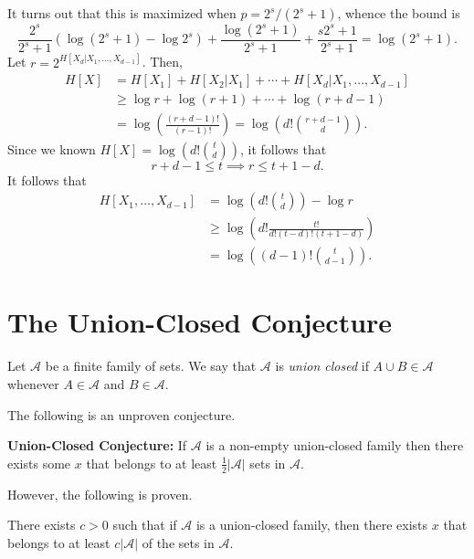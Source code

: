 \documentclass[12pt]{article}
\begin{document}
\begin{proofbox}
	It turns out that this is maximized when $p = 2^{s}/(2^{s}+1)$, whence the bound is
	\[
	\frac{2^{s}}{2^{s} + 1} (\log(2^{s} + 1) - \log 2^{s}) + \frac{\log(2^{s}+1)}{2^{s}+1} + \frac{s 2^{s} + 1}{2^{s} + 1} = \log(2^{s} + 1).
	\]
	Let $r = 2^{H[X_d|X_1,\ldots, X_{d-1}]}$. Then,
	\begin{align*}
		H[X] &= H[X_1] + H[X_2|X_1] + \cdots + H[X_d|X_1,\ldots,X_{d-1}] \\
		     &\geq \log r + \log(r + 1) + \cdots + \log(r + d - 1) \\
		     &= \log \left( \frac{(r + d - 1)!}{(r - 1)!} \right) = \log \left( d! \binom{r+d-1}d\right).
	\end{align*}
	Since we known $H[X] = \log( d! \binom t d)$, it follows that
	\[
	r + d - 1 \leq t \implies r \leq t + 1 - d.
	\]
	It follows that
	\begin{align*}
		H[X_1, \ldots, X_{d-1}] &= \log \left( d! \binom t d \right) - \log r \\
					&\geq \log \left( d! \frac{t!}{d! (t - d)! (t + 1 - d)} \right) \\
					&= \log \left((d-1)! \binom t{d-1} \right).
	\end{align*}
\end{proofbox}

\newpage

\section{The Union-Closed Conjecture}%
\label{sec:ucc}

Let $\mathcal{A}$ be a finite family of sets. We say that $\mathcal{A}$ is \emph{union closed} if $A \cup B \in \mathcal{A}$ whenever $A \in \mathcal{A}$ and $B \in \mathcal{A}$.

The following is an unproven conjecture.
\begin{center}
\textbf{Union-Closed Conjecture:} If $\mathcal{A}$ is a non-empty union-closed family then there exists some $x$ that belongs to at least $\frac 12 |\mathcal{A}|$ sets in $\mathcal{A}$.
\end{center}

However, the following is proven.
\begin{theorem}[Gilmer]
	There exists $c > 0$ such that if $\mathcal{A}$ is a union-closed family, then there exists $x$ that belongs to at least $c |\mathcal{A}|$ of the sets in $\mathcal{A}$.
\end{theorem}
\end{document}
